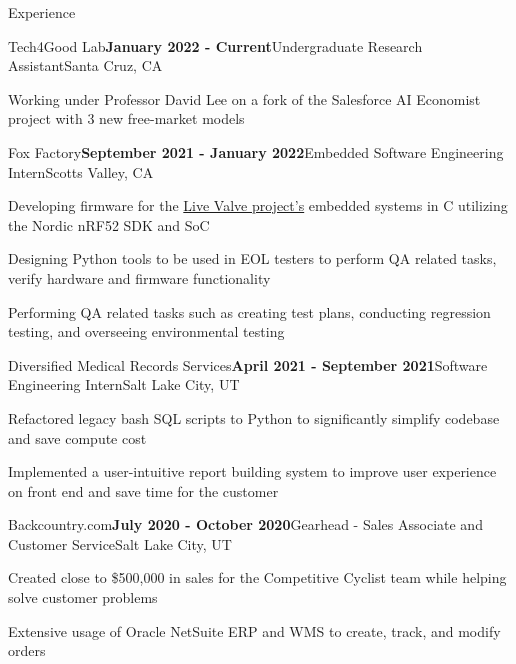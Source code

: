\documentclass{resume}
\begin{document}
\begin{rSection}{\large Experience}


\begin{rSubsection}{Tech4Good Lab}{\bf{January 2022 - Current}}{Undergraduate Research Assistant}{Santa Cruz, CA }
\item Working under Professor David Lee on a fork of the Salesforce AI Economist project with 3 new free-market models  
\end{rSubsection}

\begin{rSubsection}{Fox Factory}{\bf{September 2021 - January 2022}}{Embedded Software Engineering Intern}{Scotts Valley, CA }
\item Developing firmware for the \href{https://www.pinkbike.com/news/fox-updates-live-valve-electonic-suspension-for-2022.html}{Live Valve project's} embedded systems in C utilizing the Nordic nRF52 SDK and SoC
\item Designing Python tools to be used in EOL testers to perform QA related tasks, verify hardware and firmware functionality
\item Performing QA related tasks such as creating test plans, conducting regression testing, and overseeing environmental testing
\end{rSubsection}

\begin{rSubsection}{Diversified Medical Records Services}{\bf{April 2021 - September 2021}}{Software Engineering Intern}{Salt Lake City, UT }
\item Refactored legacy bash SQL scripts to Python to significantly simplify codebase and save compute cost
\item Implemented a user-intuitive report building system to improve user experience on front end and save time for the customer
\end{rSubsection}

\begin{rSubsection}{Backcountry.com}{\bf{July 2020 - October 2020}}{Gearhead - Sales Associate and Customer Service}{Salt Lake City, UT }
\item Created close to \$500,000 in sales for the Competitive Cyclist team while helping solve customer problems
\item Extensive usage of Oracle NetSuite ERP and WMS to create, track, and modify orders
\end{rSubsection}


\end{rSection}
\end{document}
